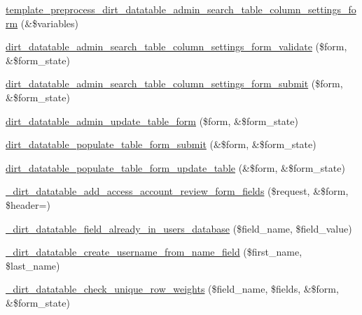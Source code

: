 \begin{DoxyCompactItemize}
\item 
\mbox{\hyperlink{dirt__datatable_8admin_8inc_ac76bff5444b9867de2e27ca18828f94e}{template\+\_\+preprocess\+\_\+dirt\+\_\+datatable\+\_\+admin\+\_\+search\+\_\+table\+\_\+column\+\_\+settings\+\_\+form}} (\&\$variables)
\item 
\mbox{\hyperlink{dirt__datatable_8admin_8inc_add4eba8a2435a326a5fbb44a73be161c}{dirt\+\_\+datatable\+\_\+admin\+\_\+search\+\_\+table\+\_\+column\+\_\+settings\+\_\+form\+\_\+validate}} (\$form, \&\$form\+\_\+state)
\item 
\mbox{\hyperlink{dirt__datatable_8admin_8inc_a513fb6c21927765c4beb17614431cd6e}{dirt\+\_\+datatable\+\_\+admin\+\_\+search\+\_\+table\+\_\+column\+\_\+settings\+\_\+form\+\_\+submit}} (\$form, \&\$form\+\_\+state)
\item 
\mbox{\hyperlink{dirt__datatable_8admin_8inc_adcb6bc3b0e68666a6abcf1dde71e3ab8}{dirt\+\_\+datatable\+\_\+admin\+\_\+update\+\_\+table\+\_\+form}} (\$form, \&\$form\+\_\+state)
\item 
\mbox{\hyperlink{dirt__datatable_8admin_8inc_a6edb6bce61e2ee9bc11ee5a13bbd87a6}{dirt\+\_\+datatable\+\_\+populate\+\_\+table\+\_\+form\+\_\+submit}} (\&\$form, \&\$form\+\_\+state)
\item 
\mbox{\hyperlink{dirt__datatable_8admin_8inc_a55db055f659d6c928c62ab9fb72b63c6}{dirt\+\_\+datatable\+\_\+populate\+\_\+table\+\_\+form\+\_\+update\+\_\+table}} (\&\$form, \&\$form\+\_\+state)
\item 
\mbox{\hyperlink{dirt__datatable_8admin_8inc_a3ebabb9444657ec24114a1acab7a9210}{\+\_\+dirt\+\_\+datatable\+\_\+add\+\_\+access\+\_\+account\+\_\+review\+\_\+form\+\_\+fields}} (\$request, \&\$form, \$header=\textquotesingle{}\textquotesingle{})
\item 
\mbox{\hyperlink{dirt__datatable_8admin_8inc_a55d1c5340c79563e5bba11ea6444b4fc}{\+\_\+dirt\+\_\+datatable\+\_\+field\+\_\+already\+\_\+in\+\_\+users\+\_\+database}} (\$field\+\_\+name, \$field\+\_\+value)
\item 
\mbox{\hyperlink{dirt__datatable_8admin_8inc_a65fa01952fb1e1783bad7c0b3cbee2fb}{\+\_\+dirt\+\_\+datatable\+\_\+create\+\_\+username\+\_\+from\+\_\+name\+\_\+field}} (\$first\+\_\+name, \$last\+\_\+name)
\item 
\mbox{\hyperlink{dirt__datatable_8admin_8inc_a11eb20235e47930d37080f541b297880}{\+\_\+dirt\+\_\+datatable\+\_\+check\+\_\+unique\+\_\+row\+\_\+weights}} (\$field\+\_\+name, \$fields, \&\$form, \&\$form\+\_\+state)
\end{DoxyCompactItemize}


